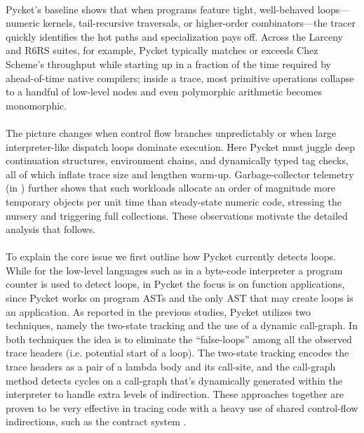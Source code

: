 	\paragraph{}%
		Pycket's baseline shows that when programs feature tight, well-behaved loops—numeric kernels, tail-recursive traversals, or higher-order combinators—the tracer quickly identifies the hot paths and specialization pays off. Across the Larceny and R6RS suites, for example, Pycket typically matches or exceeds Chez Scheme's throughput while starting up in a fraction of the time required by ahead-of-time native compilers; inside a trace, most primitive operations collapse to a handful of low-level nodes and even polymorphic arithmetic becomes monomorphic.

	\paragraph{}%
		The picture changes when control flow branches unpredictably or when large interpreter-like dispatch loops dominate execution. Here Pycket must juggle deep continuation structures, environment chains, and dynamically typed tag checks, all of which inflate trace size and lengthen warm-up. Garbage-collector telemetry (in ) further shows that such workloads allocate an order of magnitude more temporary objects per unit time than steady-state numeric code, stressing the nursery and triggering full collections. These observations motivate the detailed analysis that follows.

	\paragraph{}%
		To explain the core issue we first outline how Pycket currently detects loops. While for the low-level languages such as in a byte-code interpreter a program counter is used to detect loops, in Pycket the focus is on function applications, since Pycket works on program ASTs and the only AST that may create loops is an application. As reported in the previous studies, Pycket utilizes two techniques, namely the two-state tracking and the use of a dynamic call-graph. In both techniques the idea is to eliminate the “false-loops” among all the observed trace headers (i.e. potential start of a loop). The two-state tracking encodes the trace headers as a pair of a lambda body and its call-site, and the call-graph method detects cycles on a call-graph that's dynamically generated within the interpreter to handle extra levels of indirection. These approaches together are proven to be very effective in tracing code with a heavy use of shared control-flow indirections, such as the contract system \cite{pycketmain,pycketmain2}.

